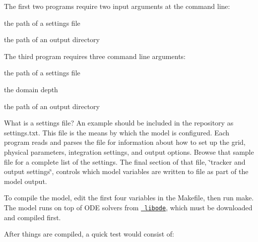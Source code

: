 The first two programs require two input arguments at the command line\+:
\begin{DoxyEnumerate}
\item the path of a settings file
\item the path of an output directory
\end{DoxyEnumerate}

The third program requires three command line arguments\+:
\begin{DoxyEnumerate}
\item the path of a settings file
\item the domain depth
\item the path of an output directory
\end{DoxyEnumerate}

What is a settings file? An example should be included in the repository as {\ttfamily settings.\+txt}. This file is the means by which the model is configured. Each program reads and parses the file for information about how to set up the grid, physical parameters, integration settings, and output options. Browse that sample file for a complete list of the settings. The final section of that file, \char`\"{}tracker and output settings\char`\"{}, controls which model variables are written to file as part of the model output.

To compile the model, edit the first four variables in the Makefile, then run {\ttfamily make}. The model runs on top of O\+DE solvers from \href{https://github.com/wordsworthgroup/libode}{\texttt{ libode}}, which must be downloaded and compiled first.

After things are compiled, a quick test would consist of\+: 
\begin{DoxyCode}{0}
\end{DoxyCode}
 
